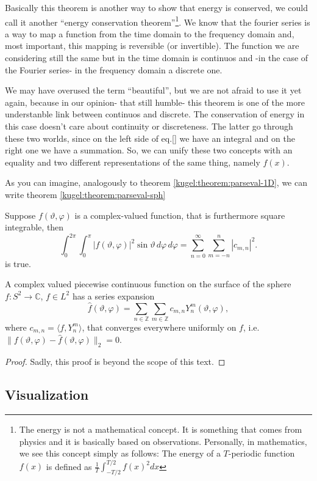 Basically this theorem is another way to show that energy is conserved, we could call it another ``energy conservation theorem''\footnote{The energy
is not a mathematical concept. It is something that comes from physics and it is basically based on observations. Personally, in mathematics, we see this concept simply as follows: The energy of a $T$-periodic function $f(x)$ is defined as $\frac{1}{T}\int_{-T/2}^{T/2}f(x)^2dx$}. 
We know that the fourier series is a way to map a function from the time
domain to the frequency domain and, most important, this mapping is reversible (or invertible). The function we are considering still the same but in the time domain is continuos and -in the case 
of the Fourier series- in the frequency domain a discrete one.

We may have overused the term ``beautiful'', but we are not afraid to use it yet again, because in our opinion- that still humble- this theorem is one of the more understanble 
link between continuos and discrete. The conservation of energy in this case doesn't care about continuity or discreteness. 
The latter go through these two worlds, since on the left side of eq.\eqref{} we have an integral and on the right one we have a summation.
So, we can unify these two concepts with an equality and two different representations of the same thing, namely $f(x)$.

As you can imagine, analogously to theorem \ref{kugel:theorem:parseval-1D}, we can write theorem \ref{kugel:theorem:parseval-sph}

\begin{theorem}
  \label{kugel:theorem:parseval-sph}
  Suppose $f(\vartheta, \varphi)$ is a complex-valued function, that is furthermore square integrable, then
  \begin{equation*}
    \int_0^{2\pi}\int_0^\pi |f(\vartheta, \varphi)|^2  \sin\vartheta \, d\varphi \, d\varphi = \sum_{n=0}^\infty
     \sum_{m=-n}^n |c_{m,n}|^2.
  \end{equation*}
  is true.
\end{theorem}



\begin{theorem}
  A complex valued piecewise continuous function on the surface of the sphere
  $f: S^2 \to \mathbb{C}$, $f \in L^2$ has a series expansion
  \begin{equation*}
    \hat{f}(\vartheta, \varphi) 
    = \sum_{n \in \mathbb{Z}} \sum_{m \in \mathbb{Z}}
      c_{m,n} Y^m_n(\vartheta, \varphi),
  \end{equation*}
  where $c_{m,n} = \langle f, Y^m_n \rangle$, that converges everywhere uniformly
  on $f$, i.e. $\|f(\vartheta, \varphi) - \hat{f}(\vartheta, \varphi)\|_2 = 0$.
\end{theorem}
\begin{proof}
  Sadly, this proof is beyond the scope of this text.
\end{proof}
\fi

\subsection{Visualization}
